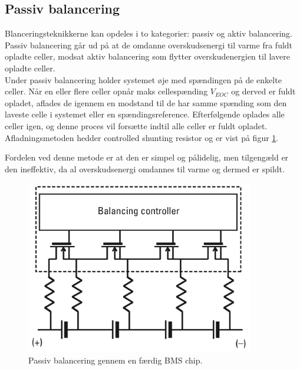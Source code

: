 \subsection{Passiv balancering}
Blanceringsteknikkerne kan opdeles i to kategorier: passiv og aktiv balancering.
\\
Passiv balancering går ud på at de omdanne overskudsenergi til varme fra fuldt opladte celler, modsat aktiv balancering som flytter overskudenergien til lavere opladte celler.
\\

Under passiv balancering holder systemet øje med spændingen på de enkelte celler. Når en eller flere celler opnår maks cellespænding $V_{EOC}$ og derved er fuldt opladet, aflades de igennem en modstand til de har samme spænding som den laveste celle i systemet eller en spændingsreference. Efterfølgende oplades alle celler igen, og denne proces vil forsætte indtil alle celler er fuldt opladet. Afladningsmetoden hedder controlled shunting resistor og er vist på figur \ref{fig:passiv_balancering_teknik}. 



Fordelen ved denne metode er at den er simpel og pålidelig, men tilgengæld er den ineffektiv, da al overskudsenergi omdannes til varme og dermed er spildt.

\begin{figure}[h]
	\centering
	\includegraphics[width=10cm]{billeder/passiv_balancering.png}
	\caption{Passiv balancering gennem en færdig BMS chip.}
	\label{fig:passiv_balancering_teknik}
\end{figure}




